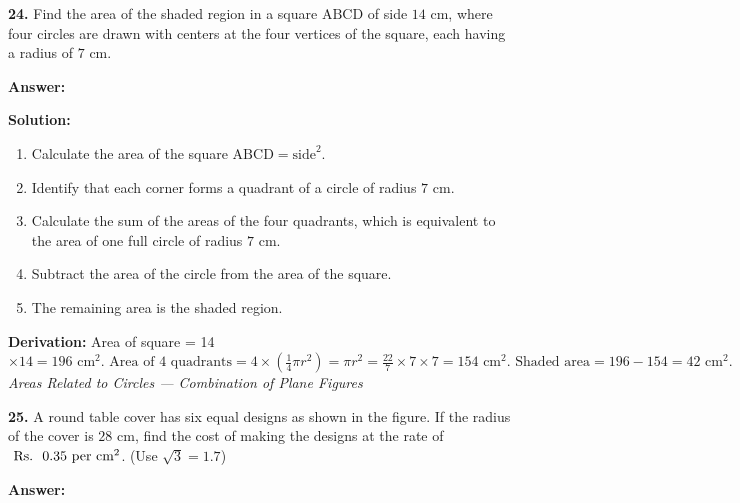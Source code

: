 \documentclass[12pt,a4paper]{exam}
\newcommand{\fitmath}[1]{%
  \sbox{\schmathbox}{$\displaystyle #1$}%
  \ifdim\wd\schmathbox>\linewidth
    \resizebox{\linewidth}{!}{\usebox{\schmathbox}}%
  \else
    \usebox{\schmathbox}%
  \fi}
\begin{document}
\begin{questions}
\question \textbf{24.} Find the area of the shaded region in a square $\text{ABCD}$ of side $14 \text{ cm}$, where four circles are drawn with centers at the four vertices of the square, each having a radius of $7 \text{ cm}$.

\textbf{Answer:}
\begin{center}
\fitmath{\text{Area} = 42 \text{ cm}^2}
\end{center}

\textbf{Solution:}
\begin{enumerate}
  \item Calculate the area of the square $\text{ABCD} = \text{side}^2$.
  \item Identify that each corner forms a quadrant of a circle of radius $7 \text{ cm}$.
  \item Calculate the sum of the areas of the four quadrants, which is equivalent to the area of one full circle of radius $7 \text{ cm}$.
  \item Subtract the area of the circle from the area of the square.
  \item The remaining area is the shaded region.
\end{enumerate}
\textbf{Derivation:}
Area of square  = 14 $\times 14 = 196 \text{ cm}^2. \text{ Area of 4 quadrants} = 4 \times (\frac{1}{4} \pi r^2) = \pi r^2 = \frac{22}{7} \times 7 \times 7 = 154 \text{ cm}^2. \text{ Shaded area} = 196 - 154 = 42 \text{ cm}^2.$ 
\hfill \textit{Areas Related to Circles — Combination of Plane Figures}
\vspace{0.3cm}

\question \textbf{25.} A round table cover has six equal designs as shown in the figure. If the radius of the cover is $28 \text{ cm}$, find the cost of making the designs at the rate of $\text{ \text{Rs.~} } 0.35 \text{ per cm}^2$. (Use $\sqrt{3} = 1.7$)

\textbf{Answer:}
\begin{center}
\fitmath{\text{Cost} = \text{ \text{Rs.~} } 162.68}
\end{center}


\end{questions}
\end{document}
